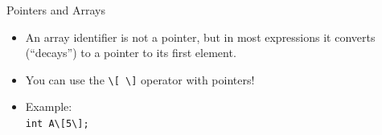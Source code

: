 \documentclass[14pt,aspectratio=1610]{beamer}
\begin{document}
\begin{frame}{Pointers and Arrays}

\begin{itemize}
\item
  An array identifier is not a pointer, but in most expressions it converts
  (``decays'') to a pointer to its first element.
\item
  You can use the \lstinline{\[ \]} operator with pointers!
\item
  Example:\\
  \lstinline|int A\[5\];|
\end{itemize}
\end{frame}
\end{document}
